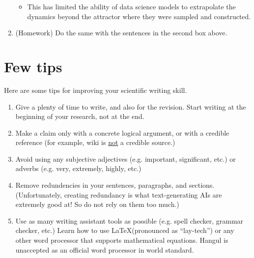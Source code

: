\documentclass{article}
\begin{document}
\begin{enumerate}
\begin{itemize}
        \vspace{1in}
        \item This has limited the ability of data science models to extrapolate the dynamics beyond the attractor where they were sampled and constructed. 
        \vspace{1in}
    \end{itemize}
    \item (Homework) Do the same with the sentences in the second box above.
\end{enumerate}



\section{Few tips}
Here are some tips for improving your scientific writing skill.
\begin{enumerate}
    \item Give a plenty of time to write, and also for the revision. Start writing at the beginning of your research, not at the end.
    \item Make a claim only with a concrete logical argument, or with a credible reference (for example, wiki is \underline{not} a credible source.)
    \item Avoid using any subjective adjectives (e.g. important, significant, etc.) or adverbs (e.g. very, extremely, highly, etc.)
    \item Remove redundencies in your sentences, paragraphs, and sections. (Unfortunately, creating redundancy is what text-generating AIs are extremely good at! So do not rely on them too much.)
    \item Use as many writing assistant tools as possible (e.g. spell checker, grammar checker, etc.) Learn how to use \LaTeX (pronounced as ``lay-tech'') or any other word processor that supports mathematical equations. Hangul\textsuperscript{\textregistered} is unaccepted as an official word processor in world standard.
\end{enumerate}
\end{document}
